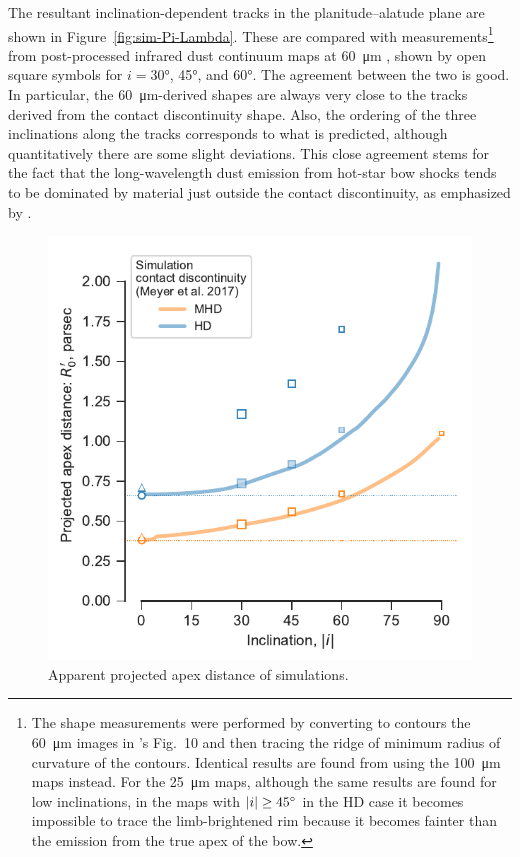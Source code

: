 The resultant inclination-dependent tracks in the planitude--alatude
plane are shown in Figure~\ref{fig:sim-Pi-Lambda}.  These are compared
with measurements\footnote{%
  The shape measurements were performed by converting to contours the
  \SI{60}{\um} images in \citet{Meyer:2017a}'s Fig.~10 and then
  tracing the ridge of minimum radius of curvature of the contours.
  Identical results are found from using the \SI{100}{\um} maps
  instead.  For the \SI{25}{\um} maps, although the same results are
  found for low inclinations, in the maps with
  \(\lvert i\rvert \ge \ang{45}\) in the HD case it becomes impossible to trace
  the limb-brightened rim because it becomes fainter than the emission
  from the true apex of the bow.} %
from post-processed infrared dust continuum maps at \SI{60}{\um}
\citep[\S~4.3 of][]{Meyer:2017a}, shown by open square symbols for
\(i = \ang{30}\), \ang{45}, and \ang{60}.  The agreement between the
two is good.  In particular, the \SI{60}{\um}-derived shapes are
always very close to the tracks derived from the contact discontinuity
shape. Also, the ordering of the three inclinations along the tracks
corresponds to what is predicted, although quantitatively there are
some slight deviations.  This close agreement stems for the fact that
the long-wavelength dust emission from hot-star bow shocks tends to be
dominated by material just outside the contact discontinuity, as
emphasized by \citet{Meyer:2014b}.

\begin{figure}
  \centering
  \includegraphics[width=\linewidth]{figs/m17-r0-prime}
  \caption[]{Apparent projected apex distance of simulations.}
  \label{fig:sim-R0-prime}
\end{figure}


